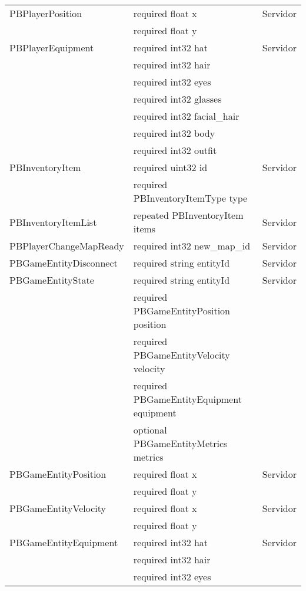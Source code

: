 \begin{longtable}{|l|l|l|}
    \hline
    PBPlayerPosition & required float x & Servidor \\
                        & required float y & \\
    \hline
    PBPlayerEquipment & required int32 hat & Servidor \\
                        & required int32 hair & \\
                        & required int32 eyes & \\
                        & required int32 glasses & \\
                        & required int32 facial\_hair & \\
                        & required int32 body & \\
                        & required int32 outfit & \\
    \hline
    PBInventoryItem & required uint32 id & Servidor \\
                    & required PBInventoryItemType type & \\
    \hline
    PBInventoryItemList & repeated PBInventoryItem items & Servidor \\
    \hline
    PBPlayerChangeMapReady & required int32 new\_map\_id & Servidor \\
    \hline
    PBGameEntityDisconnect & required string entityId & Servidor \\
    \hline
    PBGameEntityState & required string entityId & Servidor \\
                        & required PBGameEntityPosition position & \\
                        & required PBGameEntityVelocity velocity & \\
                        & required PBGameEntityEquipment equipment & \\
                        & optional PBGameEntityMetrics metrics & \\
    \hline
    PBGameEntityPosition & required float x & Servidor \\
                            & required float y & \\
    \hline
    PBGameEntityVelocity & required float x & Servidor \\
                            & required float y & \\
    \hline
    PBGameEntityEquipment & required int32 hat & Servidor \\
                            & required int32 hair & \\
                            & required int32 eyes & \\

\end{longtable}
